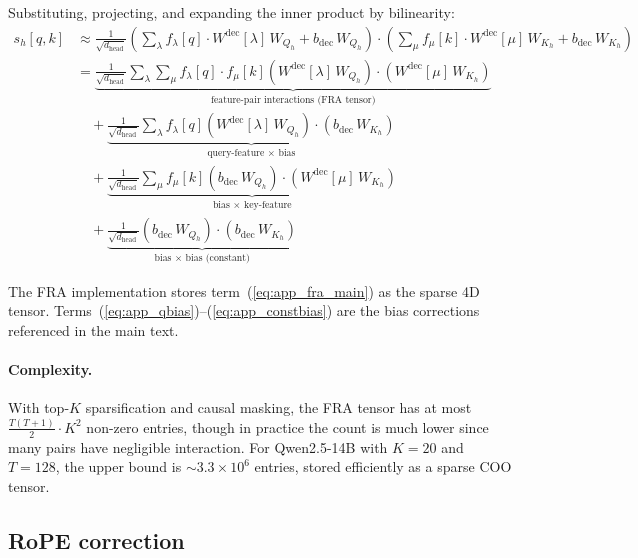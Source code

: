 \documentclass{article}
\theoremstyle{plain}
\theoremstyle{definition}
\theoremstyle{remark}
\newcommand{\Wdec}{W^{\mathrm{dec}}}
\newcommand{\dhead}{d_{\mathrm{head}}}
\newcommand{\flambda}{f_\lambda}
\newcommand{\fmu}{f_\mu}
\begin{document}
Substituting, projecting, and expanding the inner product by bilinearity:
\begin{align}
    s_h[q,k] &\approx \frac{1}{\sqrt{\dhead}} \left( \sum_\lambda \flambda[q] \cdot \Wdec[\lambda]\,W_{Q_h} + b_{\mathrm{dec}}\,W_{Q_h} \right) \cdot \left( \sum_\mu \fmu[k] \cdot \Wdec[\mu]\,W_{K_h} + b_{\mathrm{dec}}\,W_{K_h} \right) \\
    &= \underbrace{\frac{1}{\sqrt{\dhead}} \sum_\lambda \sum_\mu \flambda[q] \cdot \fmu[k] \left( \Wdec[\lambda]\,W_{Q_h} \right) \cdot \left( \Wdec[\mu]\,W_{K_h} \right)}_{\text{feature-pair interactions (FRA tensor)}} \label{eq:app_fra_main} \\
    &\quad + \underbrace{\frac{1}{\sqrt{\dhead}} \sum_\lambda \flambda[q] \left( \Wdec[\lambda]\,W_{Q_h} \right) \cdot \left( b_{\mathrm{dec}}\,W_{K_h} \right)}_{\text{query-feature $\times$ bias}} \label{eq:app_qbias} \\
    &\quad + \underbrace{\frac{1}{\sqrt{\dhead}} \sum_\mu \fmu[k] \left( b_{\mathrm{dec}}\,W_{Q_h} \right) \cdot \left( \Wdec[\mu]\,W_{K_h} \right)}_{\text{bias $\times$ key-feature}} \label{eq:app_kbias} \\
    &\quad + \underbrace{\frac{1}{\sqrt{\dhead}} \left( b_{\mathrm{dec}}\,W_{Q_h} \right) \cdot \left( b_{\mathrm{dec}}\,W_{K_h} \right)}_{\text{bias $\times$ bias (constant)}} \label{eq:app_constbias}
\end{align}

The FRA implementation stores term~(\ref{eq:app_fra_main}) as the sparse 4D tensor. Terms~(\ref{eq:app_qbias})--(\ref{eq:app_constbias}) are the bias corrections referenced in the main text.

\paragraph{Complexity.} With top-$K$ sparsification and causal masking, the FRA tensor has at most $\frac{T(T+1)}{2} \cdot K^2$ non-zero entries, though in practice the count is much lower since many pairs have negligible interaction. For Qwen2.5-14B with $K{=}20$ and $T{=}128$, the upper bound is ${\sim}3.3 \times 10^6$ entries, stored efficiently as a sparse COO tensor.

\subsection{RoPE correction}
\label{app:rope}
\end{document}
